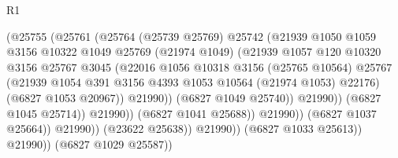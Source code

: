 \begin{lexlean}{R1}
\begin{coremodule}
                                      (@25755
                                        (@25761
                                          (@25764
                                            (@25739 @25769)
                                            @25742
                                            (@21939
                                              @1050
                                              @1059
                                              @3156
                                              @10322
                                              @1049
                                              @25769
                                              (@21974 @1049)
                                              (@21939
                                                @1057
                                                @120
                                                @10320
                                                @3156
                                                @25767
                                                @3045
                                                (@22016
                                                  @1056
                                                  @10318
                                                  @3156
                                                  (@25765 @10564)
                                                  @25767
                                                  (@21939
                                                    @1054
                                                    @391
                                                    @3156
                                                    @4393
                                                    @1053
                                                    @10564
                                                    (@21974 @1053)
                                                    @22176)
                                                  (@6827 @1053 @20967))
                                                @21990))
                                            (@6827 @1049 @25740))
                                          @21990))
                                      (@6827 @1045 @25714))
                                    @21990))
                                (@6827 @1041 @25688))
                              @21990))
                          (@6827 @1037 @25664))
                        @21990))
                    (@23622 @25638))
                  @21990))
              (@6827 @1033 @25613))
            @21990))
        (@6827 @1029 @25587))

\end{coremodule}
\end{lexlean}
